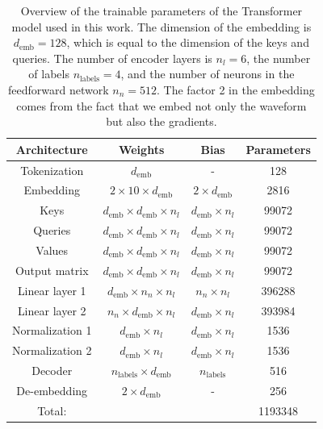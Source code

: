 \begin{table}[t]
\centering
\caption{Overview of the trainable parameters of the Transformer model used in this work.  The dimension of the embedding is $d_{\mathrm{emb}} = 128$, which is equal to the dimension of the keys and queries. The number of encoder layers is $n_{l} = 6$, the number of labels $n_{\mathrm{labels}} = 4$, and the number of neurons in the feedforward network $n_n = 512$. The factor 2 in the embedding comes from the fact that we embed not only the waveform but also the gradients.} 
\label{tab:model_parameters}
\begin{tabular}{|c | c | c | c|}
	\hline
	\textbf{Architecture} & \textbf{Weights} & \textbf{Bias} & \textbf{Parameters} \\
 	\hline
 	Tokenization & $d_{\mathrm {emb}}$  & - &  128 \\
 	\hline
 	Embedding & $2 \times 10 \times d_{\mathrm{emb}}$ & $2 \times d_{\mathrm{emb}}$ & 2816 \\
 	\hline
 	Keys  & $d_{\mathrm{emb}} \times d_{\mathrm{emb}} \times n_{l}$ & $d_{\mathrm{emb}} \times n_{l}$ &  99072 \\
 	\hline
   	Queries & $d_{\mathrm{emb}} \times d_{\mathrm{emb}} \times n_{l}$ & $d_{\mathrm{emb}} \times n_{l} $ & 99072 \\
 	\hline
 	Values & $d_{\mathrm{emb}} \times d_{\mathrm{emb}} \times n_{l}$ & $d_{\mathrm{emb}} \times n_{l}$ & 99072 \\
 	\hline
 	Output matrix & $d_{\mathrm{emb}} \times d_{\mathrm{emb}} \times n_{l}$ & $d_{\mathrm{emb}} \times n_{l}$ & 99072 \\
 	\hline
 	Linear layer 1 & $d_{\mathrm{emb}} \times n_{n} \times n_{l}$ & $n_{n} \times n_{l}$ & 396288 \\ 
 	\hline
	Linear layer 2 & $n_{n} \times d_{\mathrm{emb}} \times n_{l}$ & $d_{\mathrm{emb}} \times n_{l}$ & 393984 \\
	\hline
	Normalization 1 & $d_{\mathrm{emb}} \times n_{l}$ & $d_{\mathrm{emb}} \times n_{l}$ & 1536 \\
	\hline
	Normalization 2 & $d_{\mathrm{emb}} \times n_{l}$ & $d_{\mathrm{emb}} \times n_{l}$ & 1536 \\
	\hline
	Decoder & $n_{\mathrm{labels}} \times d_{\mathrm{emb}}$ & $n_{\mathrm{labels}}$ & 516 \\
	\hline
	De-embedding & $2 \times d_{\mathrm{emb}}$ & - & 256 \\
	\hline
	Total: & & & 1193348 \\
	\hline
\end{tabular}
\end{table}



